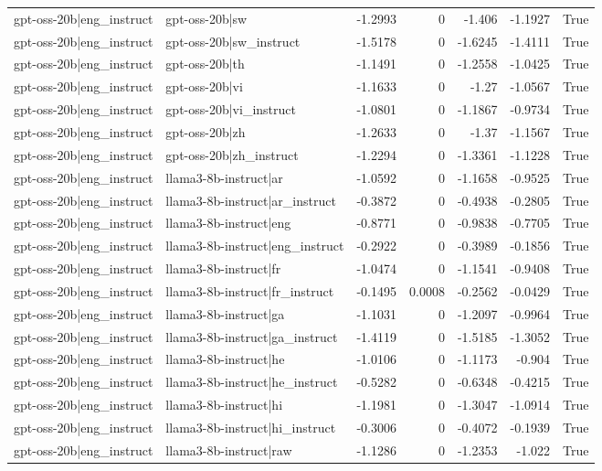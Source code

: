 \begin{table}
\begin{tabular}{l l r r r r l}
gpt-oss-20b|eng_instruct & gpt-oss-20b|sw & -1.2993 & 0 & -1.406 & -1.1927 & True \\
gpt-oss-20b|eng_instruct & gpt-oss-20b|sw_instruct & -1.5178 & 0 & -1.6245 & -1.4111 & True \\
gpt-oss-20b|eng_instruct & gpt-oss-20b|th & -1.1491 & 0 & -1.2558 & -1.0425 & True \\
gpt-oss-20b|eng_instruct & gpt-oss-20b|vi & -1.1633 & 0 & -1.27 & -1.0567 & True \\
gpt-oss-20b|eng_instruct & gpt-oss-20b|vi_instruct & -1.0801 & 0 & -1.1867 & -0.9734 & True \\
gpt-oss-20b|eng_instruct & gpt-oss-20b|zh & -1.2633 & 0 & -1.37 & -1.1567 & True \\
gpt-oss-20b|eng_instruct & gpt-oss-20b|zh_instruct & -1.2294 & 0 & -1.3361 & -1.1228 & True \\
gpt-oss-20b|eng_instruct & llama3-8b-instruct|ar & -1.0592 & 0 & -1.1658 & -0.9525 & True \\
gpt-oss-20b|eng_instruct & llama3-8b-instruct|ar_instruct & -0.3872 & 0 & -0.4938 & -0.2805 & True \\
gpt-oss-20b|eng_instruct & llama3-8b-instruct|eng & -0.8771 & 0 & -0.9838 & -0.7705 & True \\
gpt-oss-20b|eng_instruct & llama3-8b-instruct|eng_instruct & -0.2922 & 0 & -0.3989 & -0.1856 & True \\
gpt-oss-20b|eng_instruct & llama3-8b-instruct|fr & -1.0474 & 0 & -1.1541 & -0.9408 & True \\
gpt-oss-20b|eng_instruct & llama3-8b-instruct|fr_instruct & -0.1495 & 0.0008 & -0.2562 & -0.0429 & True \\
gpt-oss-20b|eng_instruct & llama3-8b-instruct|ga & -1.1031 & 0 & -1.2097 & -0.9964 & True \\
gpt-oss-20b|eng_instruct & llama3-8b-instruct|ga_instruct & -1.4119 & 0 & -1.5185 & -1.3052 & True \\
gpt-oss-20b|eng_instruct & llama3-8b-instruct|he & -1.0106 & 0 & -1.1173 & -0.904 & True \\
gpt-oss-20b|eng_instruct & llama3-8b-instruct|he_instruct & -0.5282 & 0 & -0.6348 & -0.4215 & True \\
gpt-oss-20b|eng_instruct & llama3-8b-instruct|hi & -1.1981 & 0 & -1.3047 & -1.0914 & True \\
gpt-oss-20b|eng_instruct & llama3-8b-instruct|hi_instruct & -0.3006 & 0 & -0.4072 & -0.1939 & True \\
gpt-oss-20b|eng_instruct & llama3-8b-instruct|raw & -1.1286 & 0 & -1.2353 & -1.022 & True \\

\end{tabular}
\end{table}
